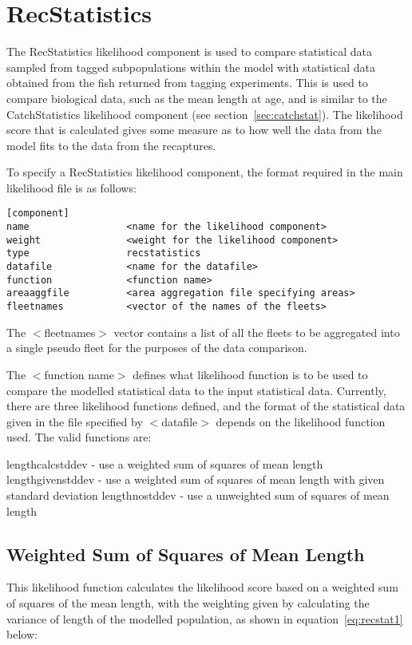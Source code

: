 \documentclass[10pt,twoside]{book}
\begin{document}
\section{RecStatistics}\label{sec:recstat}
The RecStatistics likelihood component is used to compare statistical data sampled from tagged subpopulations within the model with statistical data obtained from the fish returned from tagging experiments.  This is used to compare biological data, such as the mean length at age, and is similar to the CatchStatistics likelihood component (see section~\ref{sec:catchstat}).  The likelihood score that is calculated gives some measure as to how well the data from the model fits to the data from the recaptures.

\bigskip
To specify a RecStatistics likelihood component, the format required in the main likelihood file is as follows:

{\small\begin{verbatim}
[component]
name                 <name for the likelihood component>
weight               <weight for the likelihood component>
type                 recstatistics
datafile             <name for the datafile>
function             <function name>
areaaggfile          <area aggregation file specifying areas>
fleetnames           <vector of the names of the fleets>
\end{verbatim}}

The $<$fleetnames$>$ vector contains a list of all the fleets to be aggregated into a single pseudo fleet for the purposes of the data comparison.

\bigskip
The $<$function name$>$ defines what likelihood function is to be used to compare the modelled statistical data to the input statistical data.  Currently, there are three likelihood functions defined, and the format of the statistical data given in the file specified by $<$datafile$>$ depends on the likelihood function used.  The valid functions are:

\bigskip
lengthcalcstddev - use a weighted sum of squares of mean length\newline
lengthgivenstddev - use a weighted sum of squares of mean length with given standard deviation\newline
lengthnostddev - use a unweighted sum of squares of mean length

\subsection{Weighted Sum of Squares of Mean Length}
This likelihood function calculates the likelihood score based on a weighted sum of squares of the mean length, with the weighting given by calculating the variance of length of the modelled population, as shown in equation~\ref{eq:recstat1} below:
\end{document}
